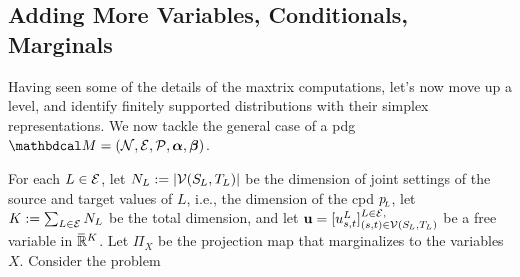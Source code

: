 \documentclass[twoside]{article}
\begin{document}
\subsection{Adding More Variables, Conditionals, Marginals}

Having seen some of the details of the maxtrix computations, let's now move up a level, and identify finitely supported distributions with their simplex representations. 
We now tackle the general case of a pdg 
$\dg M = (\N, \Ed, \mathcal P, \balpha, \bbeta)$.

For each $L \in \mathcal E$, let $N_L := |\V(\Src L, \Tgt L)|$ be the dimension of joint settings of the source and target values of $L$, i.e., the dimension of the cpd $p _{\!_{L}\!}$,
let $K := \sum_{L \in \mathcal E} N_L$ be the total dimension,
and let $\mat u = [u^L_{s,t}]^{L \in \Ed,}_{ (s,t) \in \V(\Src L, \Tgt L)}$
be a free variable in $\mskip1mu\overline{\mskip-1mu\mathbb R\!}\,^{K}$.
{\color{red} Let $\Pi_{X}$ be the projection map that marginalizes to the variables $X$. }
%
Consider the problem
\end{document}

